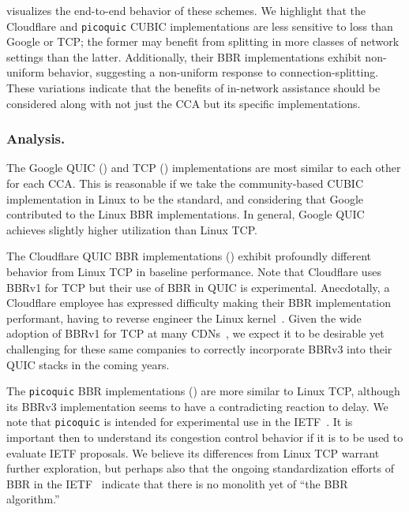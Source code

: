  visualizes the end-to-end behavior of these schemes.
We highlight that the Cloudflare and \texttt
 {picoquic} CUBIC implementations are less sensitive to loss than Google or
 TCP; the former may benefit from splitting in more classes of network settings
 than the latter. Additionally, their BBR implementations exhibit non-uniform
 behavior, suggesting a non-uniform response to
 connection-splitting. These variations indicate that the benefits of
 in-network assistance should be considered along with not just the CCA but its
 specific implementations.

\subsubsection{Analysis.}

The Google QUIC ()
and TCP ()
implementations are most similar to each other for each CCA.
This is reasonable if we take the community-based CUBIC implementation in
Linux to be the standard, and considering that Google contributed to the Linux
BBR implementations. In general, Google QUIC achieves slightly higher
utilization than Linux TCP.

The Cloudflare QUIC BBR implementations ()
exhibit profoundly different behavior from Linux TCP in baseline performance.
Note that Cloudflare uses BBRv1 for TCP but their use of BBR in QUIC
is experimental. Anecdotally, a
Cloudflare employee has expressed difficulty making
their BBR implementation performant, having to reverse engineer
the Linux kernel~\cite{cardwell2024bbrv3-ietf119-qna}. Given the wide adoption
of BBRv1 for TCP at many CDNs~\cite{ware2024ccanalyzer}, we expect it to
be desirable yet challenging for these same companies to correctly incorporate
BBRv3 into their QUIC stacks in the coming years.

The \texttt{picoquic} BBR implementations ()
are more similar to Linux TCP, although its BBRv3 implementation seems to have
a contradicting reaction to delay.
We note that \texttt{picoquic} is intended for experimental use in the
IETF~\cite{picoquic}. It is important then to understand its congestion control
behavior if it is to be used to evaluate
IETF proposals. We believe its differences from Linux TCP warrant further
exploration, but perhaps also that the ongoing standardization efforts of BBR
in the IETF~\cite{cardwell2024bbr-ietf-draft} indicate
that there is no monolith yet of ``the BBR algorithm.''

